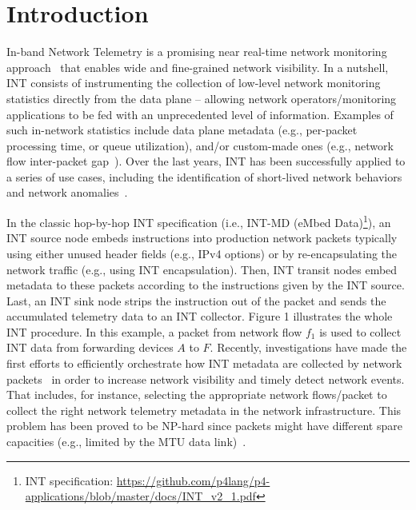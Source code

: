 \section{Introduction}
\label{sec:introduction}

In-band Network Telemetry is a promising near real-time network monitoring approach~\cite{tpp-jeyakumar2014, 8526824, infocom19-pathplanning} that enables wide and fine-grained network visibility. In a nutshell, INT consists of instrumenting the collection of low-level network monitoring statistics directly from the data plane -- allowing network operators/monitoring applications to be fed with an unprecedented level of information. Examples of such in-network statistics include data plane metadata (e.g., per-packet processing time, or queue utilization), and/or custom-made ones (e.g., network flow inter-packet gap~\cite{SIGCOMM-2020-poster}). Over the last years, INT has been successfully applied to a series of use cases, including the identification of short-lived network behaviors~\cite{10.1145/3265723.3265731} and network anomalies~\cite{comml-hohemberger-2019}.

In the classic hop-by-hop INT specification (i.e., INT-MD (eMbed Data)\footnote{INT specification: \url{https://github.com/p4lang/p4-applications/blob/master/docs/INT_v2_1.pdf}}), an INT source node embeds instructions into production network packets typically using either unused header fields (e.g., IPv4 options) or by re-encapsulating the network traffic (e.g., using INT encapsulation). Then, INT transit nodes embed metadata to these packets according to the instructions given by the INT source. Last, an INT sink node strips the instruction out of the packet and sends the accumulated telemetry data to an INT collector. Figure 1 illustrates the whole INT procedure. In this example, a packet from network flow $f_1$ is used to collect INT data from forwarding devices $A$ to $F$. Recently, investigations have made the first efforts to efficiently orchestrate how INT metadata are collected by network packets~\cite{infocom19-pathplanning, IntOpt-8761722, comml-hohemberger-2019, 9330755} in order to increase network visibility and timely detect network events. That includes, for instance, selecting the appropriate network flows/packet to collect the right network telemetry metadata in the network infrastructure. This problem has been proved to be NP-hard since packets might have different spare capacities (e.g., limited by the MTU data link)~\cite{JISA2019-int}. 

